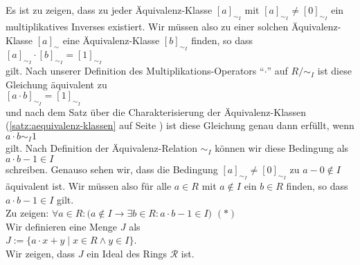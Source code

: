 \proof  
Es ist zu zeigen, dass zu jeder \"{A}quivalenz-Klasse $[a]_{\sim_I}$ mit $[a]_{\sim_I} \not= [0]_{\sim_I}$ ein
multiplikatives Inverses existiert.  Wir m\"{u}ssen also zu einer solchen \"{A}quivalenz-Klasse
$[a]_\sim$ eine \"{A}quivalenz-Klasse $[b]_{\sim_I}$ finden, so dass
\\[0.2cm]
\hspace*{1.3cm}
$[a]_{\sim_I} \cdot [b]_{\sim_I} = [1]_{\sim_I}$
\\[0.2cm]
gilt.  Nach unserer Definition des Multiplikations-Operators ``$\cdot$'' auf $R/\!\!\sim_I$ ist diese Gleichung
\"{a}quivalent zu
\\[0.2cm]
\hspace*{1.3cm}
$[a \cdot b]_{\sim_I} = [1]_{\sim_I}$
\\[0.2cm] 
und nach dem Satz \"{u}ber die Charakterisierung der \"{A}quivalenz-Klassen (\ref{satz:aequivalenz-klassen} auf
Seite \pageref{satz:aequivalenz-klassen})  ist diese Gleichung genau dann erf\"{u}llt, wenn
\\[0.2cm]
\hspace*{1.3cm}
$a \cdot b \sim_I 1$
\\[0.2cm]
gilt.  Nach Definition der \"Aquivalenz-Relation $\sim_I$ k\"{o}nnen wir diese Bedingung als
\\[0.2cm]
\hspace*{1.3cm}
$a \cdot b - 1 \in I$
\\[0.2cm]
schreiben.  Genauso sehen wir, dass die Bedingung $[a]_{\sim_I} \not= [0]_{\sim_I}$ zu $a - 0 \not\in I$ \"{a}quivalent ist.
Wir m\"{u}ssen also f\"{u}r alle $a \in R$ mit $a \not\in I$ ein $b \in R$ finden, so dass $a \cdot b - 1 \in I$
gilt.
\\[0.2cm]
\hspace*{1.3cm}
Zu zeigen: \quad 
$\forall a \in R:\bigl(a \not \in I \rightarrow \exists b \in R: a \cdot b - 1 \in I\bigr)$
\hspace*{\fill} $(*)$
\\[0.2cm]
Wir definieren eine Menge $J$ als
\\[0.2cm]
\hspace*{1.3cm}
$J := \bigl\{ a \cdot x + y \mid x \in R \wedge y \in I \bigr\}$.
\\[0.2cm]
Wir zeigen, dass $J$ ein Ideal des Rings $\mathcal{R}$ ist.
